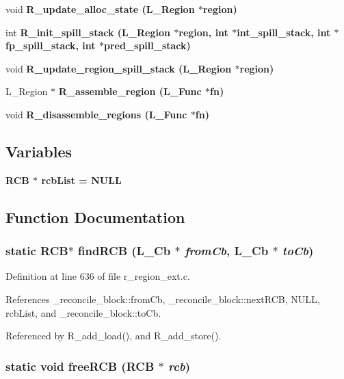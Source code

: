 \begin{CompactItemize}
\item 
void \bf{R\_\-update\_\-alloc\_\-state} (L\_\-Region $\ast$\bf{region})
\item 
int \bf{R\_\-init\_\-spill\_\-stack} (L\_\-Region $\ast$\bf{region}, int $\ast$\bf{int\_\-spill\_\-stack}, int $\ast$\bf{fp\_\-spill\_\-stack}, int $\ast$\bf{pred\_\-spill\_\-stack})
\item 
void \bf{R\_\-update\_\-region\_\-spill\_\-stack} (L\_\-Region $\ast$\bf{region})
\item 
L\_\-Region $\ast$ \bf{R\_\-assemble\_\-region} (L\_\-Func $\ast$fn)
\item 
void \bf{R\_\-disassemble\_\-regions} (L\_\-Func $\ast$fn)
\end{CompactItemize}
\subsection*{Variables}
\begin{CompactItemize}
\item 
\bf{RCB} $\ast$ \bf{rcb\-List} = \bf{NULL}
\end{CompactItemize}


\subsection{Function Documentation}
\subsubsection{\setlength{\rightskip}{0pt plus 5cm}static \bf{RCB}$\ast$ find\-RCB (L\_\-Cb $\ast$ {\em from\-Cb}, L\_\-Cb $\ast$ {\em to\-Cb})\hspace{0.3cm}{\tt  [static]}}\label{r__region__ext_8c_e285686783cd71af8add5875ff3a7b35}




Definition at line 636 of file r\_\-region\_\-ext.c.

References \_\-reconcile\_\-block::from\-Cb, \_\-reconcile\_\-block::next\-RCB, NULL, rcb\-List, and \_\-reconcile\_\-block::to\-Cb.

Referenced by R\_\-add\_\-load(), and R\_\-add\_\-store().
\subsubsection{\setlength{\rightskip}{0pt plus 5cm}static void free\-RCB (\bf{RCB} $\ast$ {\em rcb})\hspace{0.3cm}{\tt  [static]}}\label{r__region__ext_8c_8e2fdc4cef054fb85afbb6bb559a447e}





